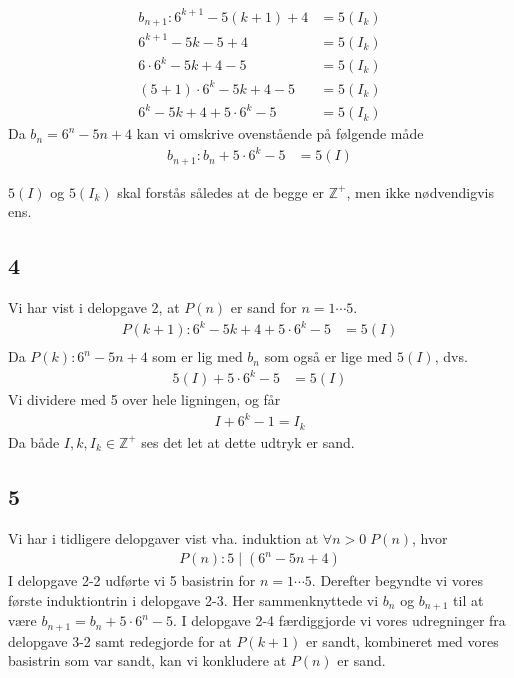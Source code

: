 \documentclass[a4paper]{article}
\newcommand{\setZ}{\mathbb{Z}}
\begin{document}
\begin{align*}
b_{n+1} : 6^{k+1}-5(k+1)+4 &= 5(I_k) \\
6^{k+1}-5k -5 +4 &= 5(I_k) \\
6\cdot6^k-5k+4-5 &= 5(I_k) \\
(5+1)\cdot6^k-5k+4-5 &= 5(I_k) \\
6^k-5k+4+5\cdot6^k-5 &= 5(I_k) 
\end{align*}
Da $b_n = 6^n-5n+4$ kan vi omskrive ovenstående på følgende måde
\begin{align*}
b_{n+1} : b_n + 5\cdot6^k-5 &= 5(I)
\end{align*}

$5(I)$ og $5(I_k)$ skal forstås således at de begge er $\setZ^+$, men ikke nødvendigvis ens. 

\subsection*{4}
Vi har vist i delopgave 2, at $P(n)$ er sand for $n=1\cdots5$.
\begin{align*}
P(k+1) : 6^k-5k+4+5\cdot6^k-5 &= 5(I) \\
\end{align*}
Da $P(k) : 6^n-5n+4$ som er lig med $b_n$ som også er lige med $5(I)$, dvs.
\begin{align*}
5(I)+5\cdot6^k-5 &= 5(I)
\end{align*}
Vi dividere med 5 over hele ligningen, og får
\begin{align*}
I+6^k-1 = I_k
\end{align*}
Da både $I, k, I_k \in \setZ^+$ ses det let at dette udtryk er sand. 

\subsection*{5}
Vi har i tidligere delopgaver vist vha. induktion at $\forall n>0\;P(n)$, hvor 
\begin{align*}
P(n):5\;|\;(6^n-5n+4)
\end{align*}
I delopgave 2-2 udførte vi 5 basistrin for $n=1\cdots5$. Derefter begyndte vi vores første induktiontrin i delopgave 2-3. Her sammenknyttede vi $b_n$ og $b_{n+1}$ til at være $b_{n+1} = b_n + 5\cdot6^n-5$. I delopgave 2-4 færdiggjorde vi vores udregninger fra delopgave 3-2 samt redegjorde for at $P(k+1)$ er sandt, kombineret med vores basistrin som var sandt, kan vi konkludere at $P(n)$ er sand.
\end{document}
